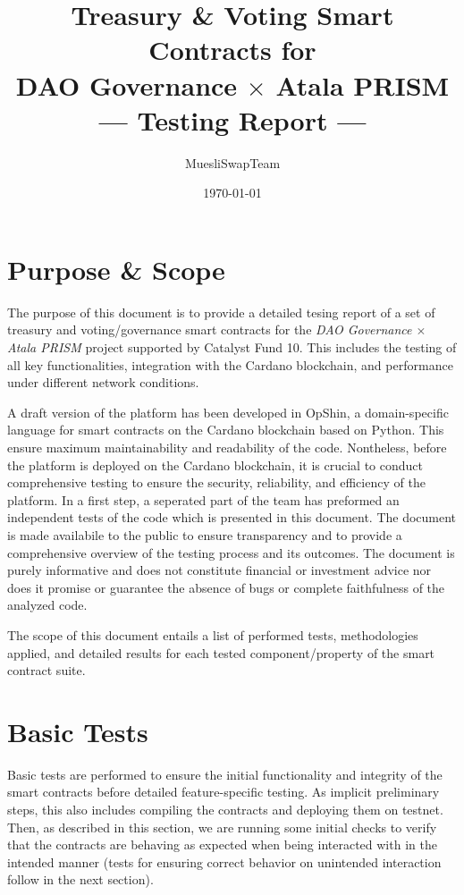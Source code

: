 \documentclass[11pt]{article}
\title{Treasury \& Voting Smart Contracts for\\DAO Governance $\times$ Atala PRISM\\[12pt]--- Testing Report ---}
\author{MuesliSwapTeam}
\date{\today}
\begin{document}
\maketitle

\section{Purpose \& Scope}
The purpose of this document is to provide a detailed tesing report of a set of treasury and voting/governance smart contracts for the \emph{DAO Governance $\times$ Atala PRISM} project supported by Catalyst Fund 10. This includes the testing of all key functionalities, integration with the Cardano blockchain, and performance under different network conditions.

A draft version of the platform has been developed in OpShin, a domain-specific language for smart contracts on the Cardano blockchain based on Python.
This ensure maximum maintainability and readability of the code.
Nontheless, before the platform is deployed on the Cardano blockchain, it is crucial to conduct comprehensive testing to ensure the security, reliability, and efficiency of the platform.
In a first step, a seperated part of the team has preformed an independent tests of the code which is presented in this document.
The document is made availabile to the public to ensure transparency and to provide a comprehensive overview of the testing process and its outcomes.
The document is purely informative and does not constitute financial or investment advice nor does it promise or guarantee the absence of bugs
or complete faithfulness of the analyzed code.

The scope of this document entails a list of performed tests, methodologies applied, and detailed results for each tested component/property of the smart contract suite.

\section{Basic Tests}

Basic tests are performed to ensure the initial functionality and integrity of the smart contracts before detailed feature-specific testing. As implicit preliminary steps, this also includes compiling the contracts and deploying them on testnet. Then, as described in this section, we are running some initial checks to verify that the contracts are behaving as expected when being interacted with in the intended manner (tests for ensuring correct behavior on unintended interaction follow in the next section).
\end{document}
